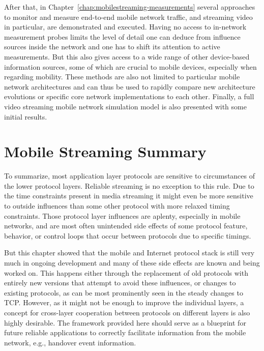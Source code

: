 After that, in Chapter~\ref{chap:mobilestreaming-measurements} several approaches to monitor and measure end-to-end mobile network traffic, and streaming video in particular, are demonstrated and executed. Having no access to in-network measurement probes limits the level of detail one can deduce from influence sources inside the network and one has to shift its attention to active measurements. But this also gives access to a wide range of other device-based information sources, some of which are crucial to mobile devices, especially when regarding mobility. These methods are also not limited to particular mobile network architectures and can thus be used to rapidly compare new architecture evolutions or specific core network implementations to each other. Finally, a full video streaming mobile network simulation model is also presented with some initial results.








\section{Mobile Streaming Summary}

To summarize, most application layer protocols are sensitive to circumstances of the lower protocol layers. Reliable streaming is no exception to this rule. Due to the time constraints present in media streaming it might even be more sensitive to outside influences than some other protocol with more relaxed timing constraints. Those protocol layer influences are aplenty, especially in mobile networks, and are most often unintended side effects of some protocol feature, behavior, or control loops that occur between protocols due to specific timings.

But this chapter showed that the mobile and Internet protocol stack is still very much in ongoing development and many of these side effects are known and being worked on. This happens either through the replacement of old protocols with entirely new versions that attempt to avoid these influences, or changes to existing protocols, as can be most prominently seen in the steady changes to \gls{TCP}. However, as it might not be enough to improve the individual layers, a concept for cross-layer cooperation between protocols on different layers is also highly desirable. The framework provided here should serve as a blueprint for future reliable applications to correctly facilitate information from the mobile network, e.g., handover event information.


